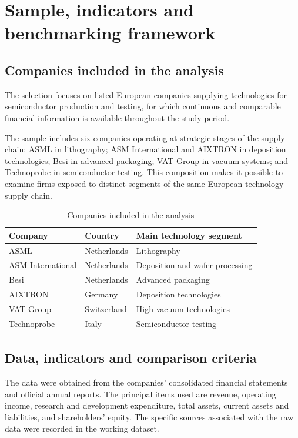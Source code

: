 \documentclass[11pt,a4paper]{article}
\begin{document}
\section{Sample, indicators and benchmarking framework}

\subsection{Companies included in the analysis}

The selection focuses on listed European companies supplying technologies for semiconductor production and testing, for which continuous and comparable financial information is available throughout the study period.

The sample includes six companies operating at strategic stages of the supply chain: ASML in lithography; ASM International and AIXTRON in deposition technologies; Besi in advanced packaging; VAT Group in vacuum systems; and Technoprobe in semiconductor testing. This composition makes it possible to examine firms exposed to distinct segments of the same European technology supply chain.

\begin{table}[H]
\centering
\caption{Companies included in the analysis}
\small
\begin{tabular}{lll}
\toprule
\textbf{Company} & \textbf{Country} & \textbf{Main technology segment} \\
\midrule
ASML & Netherlands & Lithography \\
ASM International & Netherlands & Deposition and wafer processing \\
Besi & Netherlands & Advanced packaging \\
AIXTRON & Germany & Deposition technologies \\
VAT Group & Switzerland & High-vacuum technologies \\
Technoprobe & Italy & Semiconductor testing \\
\bottomrule
\end{tabular}
\end{table}

\subsection{Data, indicators and comparison criteria}

The data were obtained from the companies' consolidated financial statements and official annual reports. The principal items used are revenue, operating income, research and development expenditure, total assets, current assets and liabilities, and shareholders' equity. The specific sources associated with the raw data were recorded in the working dataset.
\end{document}

